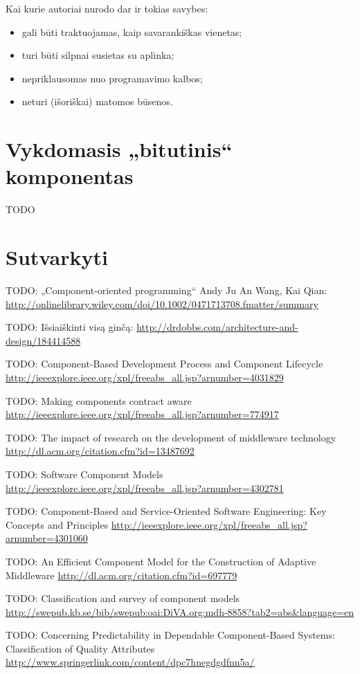 Kai kurie autoriai nurodo dar ir tokias savybes:
\begin{itemize}
  \item gali būti traktuojamas, kaip savarankiškas vienetas;
  \item turi būti silpnai susietas su aplinka;
  \item nepriklausomas nuo programavimo kalbos;
  \item neturi (išoriškai) matomos būsenos.
\end{itemize}

\section{Vykdomasis „bitutinis“ komponentas}

TODO

\section{Sutvarkyti}

TODO: „Component-oriented programming“ Andy Ju An Wang, Kai Qian:
\url{http://onlinelibrary.wiley.com/doi/10.1002/0471713708.fmatter/summary}

TODO: Išsiaiškinti visą ginčą:
\url{http://drdobbs.com/architecture-and-design/184414588}
\cite{what-to-compose}

TODO: Component-Based Development Process and Component Lifecycle
\url{http://ieeexplore.ieee.org/xpl/freeabs_all.jsp?arnumber=4031829}

TODO: Making components contract aware
\url{http://ieeexplore.ieee.org/xpl/freeabs_all.jsp?arnumber=774917}

TODO: The impact of research on the development of middleware technology
\url{http://dl.acm.org/citation.cfm?id=13487692}

TODO: Software Component Models
\url{http://ieeexplore.ieee.org/xpl/freeabs_all.jsp?arnumber=4302781}

TODO: Component-Based and Service-Oriented Software Engineering: Key Concepts and Principles 
\url{http://ieeexplore.ieee.org/xpl/freeabs_all.jsp?arnumber=4301060}

TODO: An Efficient Component Model for the Construction of Adaptive Middleware
\url{http://dl.acm.org/citation.cfm?id=697779}

TODO: Classification and survey of component models
\url{http://swepub.kb.se/bib/swepub:oai:DiVA.org:mdh-8858?tab2=abs&language=en}

TODO: Concerning Predictability in Dependable Component-Based Systems: Classification of Quality Attributes 
\url{http://www.springerlink.com/content/dpc7hnegdgdfnn5a/}

